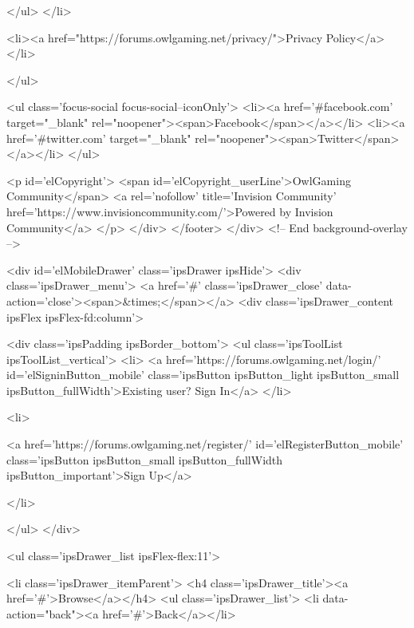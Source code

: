 			</ul>
</li>
	
	
		<li><a href="https://forums.owlgaming.net/privacy/">Privacy Policy</a></li>
	
	
</ul>	


<ul class='focus-social focus-social--iconOnly'>
	<li><a href='#facebook.com' target="_blank" rel="noopener"><span>Facebook</span></a></li>
<li><a href='#twitter.com' target="_blank" rel="noopener"><span>Twitter</span></a></li>
</ul>



<p id='elCopyright'>
	<span id='elCopyright_userLine'>OwlGaming Community</span>
	<a rel='nofollow' title='Invision Community' href='https://www.invisioncommunity.com/'>Powered by Invision Community</a>
</p>
				</div>
			</footer>
</div> <!-- End background-overlay -->
			
<div id='elMobileDrawer' class='ipsDrawer ipsHide'>
	<div class='ipsDrawer_menu'>
		<a href='#' class='ipsDrawer_close' data-action='close'><span>&times;</span></a>
		<div class='ipsDrawer_content ipsFlex ipsFlex-fd:column'>
			
				<div class='ipsPadding ipsBorder_bottom'>
					<ul class='ipsToolList ipsToolList_vertical'>
						<li>
							<a href='https://forums.owlgaming.net/login/' id='elSigninButton_mobile' class='ipsButton ipsButton_light ipsButton_small ipsButton_fullWidth'>Existing user? Sign In</a>
						</li>
						
							<li>
								
									<a href='https://forums.owlgaming.net/register/'  id='elRegisterButton_mobile' class='ipsButton ipsButton_small ipsButton_fullWidth ipsButton_important'>Sign Up</a>
								
							</li>
						
					</ul>
				</div>
			

			<ul class='ipsDrawer_list ipsFlex-flex:11'>
				

				
				
				
				
					
						
						
							<li class='ipsDrawer_itemParent'>
								<h4 class='ipsDrawer_title'><a href='#'>Browse</a></h4>
								<ul class='ipsDrawer_list'>
									<li data-action="back"><a href='#'>Back</a></li>
									
									
										
										
										
											
												
